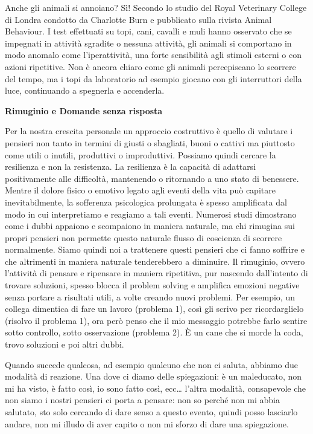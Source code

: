 \documentclass[12pt]{book} %
\begin{document}
\begin{mdframed}[linewidth=1pt]
Anche gli animali si annoiano? Sì! Secondo lo studio del Royal Veterinary College di Londra condotto da Charlotte Burn e
pubblicato sulla rivista Animal Behaviour. I test effettuati su topi, cani, cavalli e muli hanno osservato che se
impegnati in attività sgradite o nessuna attività, gli animali si comportano in modo anomalo come l'iperattività, una
forte sensibilità agli stimoli esterni o con azioni ripetitive. Non è ancora chiaro come gli animali percepiscano lo
scorrere del tempo, ma i topi da laboratorio ad esempio giocano con gli interruttori della luce, continuando a
spegnerla e accenderla. 
\end{mdframed}


\textbf{Rimuginio e Domande senza risposta}

Per la nostra crescita personale un approccio costruttivo è quello di valutare i pensieri non tanto in termini di giusti o sbagliati, buoni o cattivi ma piuttosto come utili o inutili, produttivi o improduttivi. Possiamo quindi cercare la resilienza e non la resistenza. La resilienza è la capacità di adattarsi positivamente alle difficoltà, mantenendo o ritornando a uno stato di benessere. Mentre il dolore fisico o emotivo legato agli eventi della vita può capitare inevitabilmente, la sofferenza psicologica prolungata è spesso amplificata dal modo in cui interpretiamo e reagiamo a tali eventi. 
Numerosi studi dimostrano come i
dubbi appaiono e scompaiono in maniera naturale, ma chi rimugina sui propri pensieri non permette questo naturale
flusso di coscienza di scorrere normalmente. Siamo quindi noi a trattenere questi pensieri che ci fanno soffrire e
che altrimenti in maniera naturale tenderebbero a diminuire. Il rimuginio, ovvero l'attività di pensare e
ripensare in maniera ripetitiva, pur nascendo dall’intento di trovare soluzioni, spesso blocca il problem solving e amplifica emozioni negative senza portare a risultati utili, a volte creando nuovi problemi. Per esempio, un collega dimentica di fare un lavoro (problema 1), così gli scrivo per
ricordarglielo (risolvo il problema 1), ora però penso che il mio messaggio potrebbe farlo sentire sotto controllo,
sotto osservazione (problema 2). È un cane che si morde la coda, trovo soluzioni e poi altri dubbi.

Quando succede qualcosa, ad esempio qualcuno che non ci saluta, abbiamo due modalità di reazione. Una dove ci diamo delle spiegazioni: è un maleducato, non mi ha visto, è fatto così, io sono fatto così, ecc… l'altra modalità, consapevole che non siamo i nostri pensieri ci porta a pensare: non so perché non mi abbia salutato, sto solo cercando di dare senso a questo evento, quindi posso lasciarlo andare, non mi illudo di aver capito o non mi sforzo di dare una spiegazione.
\end{document}
